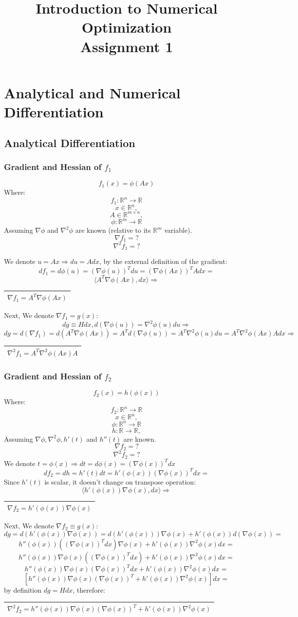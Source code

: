 \documentclass[12pt]{article}
\title{Introduction to Numerical Optimization\\Assignment 1}
\author{}%
\newcommand{\rectres}[1]{
\begin{center}
\begin{tabular}{ |c| }
\hline
 #1\\
\hline
\end{tabular}
\end{center}
}
\begin{document}
\maketitle


\section{Analytical and Numerical Differentiation}

\subsection{Analytical Differentiation}

\subsubsection{Gradient and Hessian of $f_1$}
$$f_1(x)=\phi(Ax)$$
Where:
$$f_1:\mathbb{R}^n \rightarrow \mathbb{R}$$
$$x \in \mathbb{R}^{n},$$
$$A \in \mathbb{R}^{m\times n},$$
$$\phi:\mathbb{R}^m \rightarrow \mathbb{R}$$
Assuming $\nabla\phi$ and $\nabla^2\phi$ are known (relative to its $\mathbb{R}^m$ variable).
$$\nabla f_1 = ?$$
$$\nabla^2 f_1 = ?$$

We denote $u=Ax \Rightarrow du=Adx$, by the external definition of the gradient:
$$df_1=d\phi(u)=(\nabla\phi(u))^T du = (\nabla\phi(Ax))^T A dx = $$
$$ \langle A^T\nabla \phi(Ax), dx \rangle \Rightarrow $$
\rectres{$\nabla f_1 = A^T\nabla \phi(Ax)$}
Next, We denote $\nabla f_1= g(x)$:
$$dg\equiv Hdx,d(\nabla \phi(u)) =  \nabla^2 \phi(u) du \Rightarrow$$
$$dg=d(\nabla f_1) = d(A^T\nabla \phi(Ax))=A^Td(\nabla \phi(u))=A^T\nabla^2 \phi(u) du = A^T\nabla^2 \phi(Ax) A dx \Rightarrow$$
\rectres{$\nabla^2 f_1 = A^T\nabla^2 \phi(Ax) A$}

\subsubsection{Gradient and Hessian of $f_2$}
$$f_2(x)=h(\phi(x))$$
Where:
$$f_2:\mathbb{R}^n \rightarrow \mathbb{R}$$
$$x \in \mathbb{R}^{n},$$
$$\phi:\mathbb{R}^n \rightarrow \mathbb{R}$$
$$h:\mathbb{R} \rightarrow \mathbb{R},$$
Assuming $\nabla\phi, \nabla^2\phi, h'(t)$ and $h''(t)$ are known.
$$\nabla f_2 = ?$$
$$\nabla^2 f_2 = ?$$
We denote $t=\phi(x)\Rightarrow dt=d\phi(x)=(\nabla \phi(x))^Tdx$
$$df_2= dh = h'(t)dt = h'(\phi(x))(\nabla \phi(x))^Tdx=$$
Since $h'(t)$ is scalar, it doesn't change on transpose operation:
$$\langle h'(\phi(x))\nabla \phi(x), dx \rangle \Rightarrow$$
\rectres{$\nabla f_2 = h'(\phi(x))\nabla \phi(x)$}
Next, We denote $\nabla f_2 \equiv g(x)$:
$$dg = d(h'(\phi(x))\nabla \phi(x)) =  d(h'(\phi(x)))\nabla \phi(x) + h'(\phi(x))d(\nabla \phi(x))=$$
$$h''(\phi(x))((\nabla \phi(x))^Tdx)\nabla \phi(x) + h'(\phi(x))\nabla^2 \phi(x)dx=$$
$$h''(\phi(x))\nabla \phi(x)((\nabla \phi(x))^Tdx) + h'(\phi(x))\nabla^2 \phi(x)dx=$$
$$h''(\phi(x))\nabla \phi(x)(\nabla \phi(x))^Tdx + h'(\phi(x))\nabla^2 \phi(x)dx=$$
$$[h''(\phi(x))\nabla \phi(x)(\nabla \phi(x))^T + h'(\phi(x))\nabla^2 \phi(x)]dx=$$
by definition $dg=Hdx$, therefore:
\rectres{$\nabla^2 f_2 = h''(\phi(x))\nabla \phi(x)(\nabla \phi(x))^T + h'(\phi(x))\nabla^2 \phi(x)$}
\newpage
\end{document}
